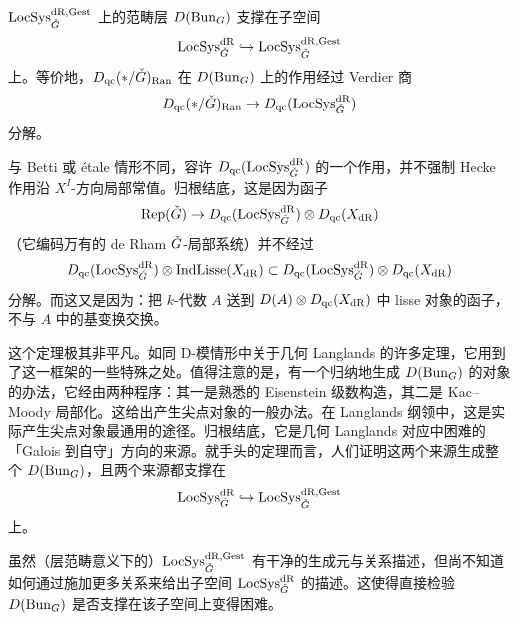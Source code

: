 \begin{theorem}
$\operatorname{LocSys}^{\mathrm{dR},\mathrm{Gest}}_{\check{G}}$ 上的范畴层 $D(\operatorname{Bun}_G)$ 支撑在子空间
\[
\operatorname{LocSys}^{\mathrm{dR}}_{\check{G}}\hookrightarrow\operatorname{LocSys}^{\mathrm{dR},\mathrm{Gest}}_{\check{G}}
\]
上。等价地，$D_{\mathrm{qc}}(\ast/\check{G})_{\mathrm{Ran}}$ 在 $D(\operatorname{Bun}_G)$ 上的作用经过 Verdier 商
\[
D_{\mathrm{qc}}(\ast/\check{G})_{\mathrm{Ran}}\to D_{\mathrm{qc}}(\operatorname{LocSys}^{\mathrm{dR}}_{\check{G}})
\]
分解。
\end{theorem}

\begin{remark}
与 Betti 或 étale 情形不同，容许 $D_{\mathrm{qc}}(\operatorname{LocSys}^{\mathrm{dR}}_{\check{G}})$ 的一个作用，并不强制 Hecke 作用沿 $X^I$-方向局部常值。归根结底，这是因为函子
\[
\operatorname{Rep}(\check{G})\to D_{\mathrm{qc}}(\operatorname{LocSys}^{\mathrm{dR}}_{\check{G}})\otimes D_{\mathrm{qc}}(X_{\mathrm{dR}})
\]
（它编码万有的 de Rham $\check{G}$-局部系统）并不经过
\[
D_{\mathrm{qc}}(\operatorname{LocSys}^{\mathrm{dR}}_{\check{G}})\otimes\mathrm{IndLisse}(X_{\mathrm{dR}})\subset D_{\mathrm{qc}}(\operatorname{LocSys}^{\mathrm{dR}}_{\check{G}})\otimes D_{\mathrm{qc}}(X_{\mathrm{dR}})
\]
分解。而这又是因为：把 $k$-代数 $A$ 送到 $D(A)\otimes D_{\mathrm{qc}}(X_{\mathrm{dR}})$ 中 lisse 对象的函子，不与 $A$ 中的基变换交换。
\end{remark}

这个定理极其非平凡。如同 D-模情形中关于几何 Langlands 的许多定理，它用到了这一框架的一些特殊之处。值得注意的是，有一个归纳地生成 $D(\operatorname{Bun}_G)$ 的对象的办法，它经由两种程序：其一是熟悉的 Eisenstein 级数构造，其二是 Kac--Moody 局部化。这给出产生尖点对象的一般办法。在 Langlands 纲领中，这是实际产生尖点对象最通用的途径。归根结底，它是几何 Langlands 对应中困难的「Galois 到自守」方向的来源。就手头的定理而言，人们证明这两个来源生成整个 $D(\operatorname{Bun}_G)$，且两个来源都支撑在
\[
\operatorname{LocSys}^{\mathrm{dR}}_{\check{G}}\hookrightarrow\operatorname{LocSys}^{\mathrm{dR},\mathrm{Gest}}_{\check{G}}
\]
上。

\begin{remark}
虽然（层范畴意义下的）$\operatorname{LocSys}^{\mathrm{dR},\mathrm{Gest}}_{\check{G}}$ 有干净的生成元与关系描述，但尚不知道如何通过施加更多关系来给出子空间 $\operatorname{LocSys}^{\mathrm{dR}}_{\check{G}}$ 的描述。这使得直接检验 $D(\operatorname{Bun}_G)$ 是否支撑在该子空间上变得困难。
\end{remark}

